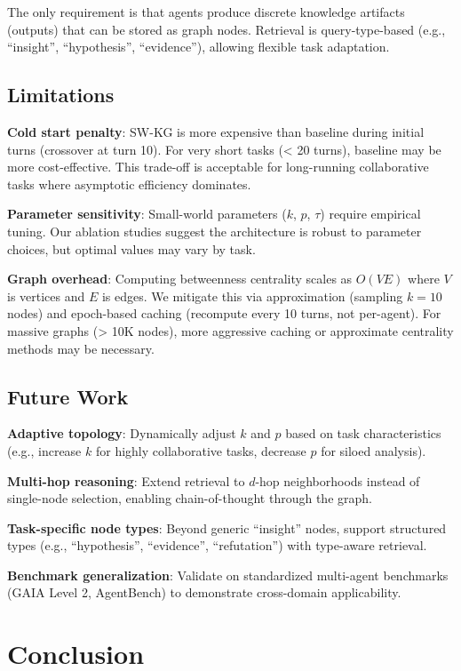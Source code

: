 \documentclass[11pt]{article}
\begin{document}
The only requirement is that agents produce discrete knowledge artifacts (outputs) that can be stored as graph nodes. Retrieval is query-type-based (e.g., ``insight'', ``hypothesis'', ``evidence''), allowing flexible task adaptation.

\subsection{Limitations}

\textbf{Cold start penalty}: SW-KG is more expensive than baseline during initial turns (crossover at turn 10). For very short tasks (< 20 turns), baseline may be more cost-effective. This trade-off is acceptable for long-running collaborative tasks where asymptotic efficiency dominates.

\textbf{Parameter sensitivity}: Small-world parameters ($k$, $p$, $\tau$) require empirical tuning. Our ablation studies suggest the architecture is robust to parameter choices, but optimal values may vary by task.

\textbf{Graph overhead}: Computing betweenness centrality scales as $O(VE)$ where $V$ is vertices and $E$ is edges. We mitigate this via approximation (sampling $k=10$ nodes) and epoch-based caching (recompute every 10 turns, not per-agent). For massive graphs (> 10K nodes), more aggressive caching or approximate centrality methods may be necessary.

\subsection{Future Work}

\textbf{Adaptive topology}: Dynamically adjust $k$ and $p$ based on task characteristics (e.g., increase $k$ for highly collaborative tasks, decrease $p$ for siloed analysis).

\textbf{Multi-hop reasoning}: Extend retrieval to $d$-hop neighborhoods instead of single-node selection, enabling chain-of-thought through the graph.

\textbf{Task-specific node types}: Beyond generic ``insight'' nodes, support structured types (e.g., ``hypothesis'', ``evidence'', ``refutation'') with type-aware retrieval.

\textbf{Benchmark generalization}: Validate on standardized multi-agent benchmarks (GAIA Level 2, AgentBench) to demonstrate cross-domain applicability.

\section{Conclusion}
\end{document}
